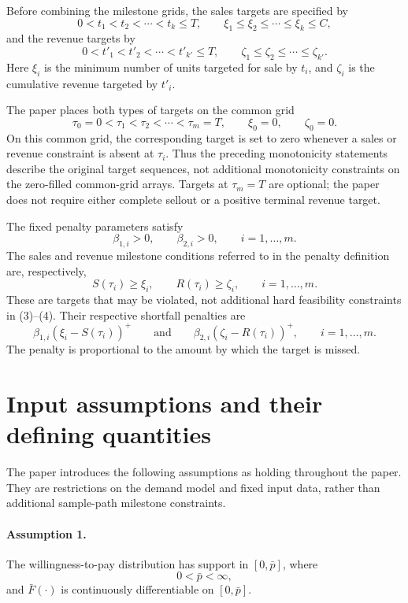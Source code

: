 \documentclass{article}
\begin{document}
Before combining the milestone grids, the sales targets are specified by
\[
0<t_1<t_2<\cdots<t_k\le T,
\qquad
\xi_1\le\xi_2\le\cdots\le\xi_k\le C,
\]
and the revenue targets by
\[
0<t'_1<t'_2<\cdots<t'_{k'}\le T,
\qquad
\zeta_1\le\zeta_2\le\cdots\le\zeta_{k'}.
\]
Here $\xi_i$ is the minimum number of units targeted for sale by $t_i$, and $\zeta_i$ is the cumulative revenue targeted by $t'_i$.

The paper places both types of targets on the common grid
\[
\tau_0=0<\tau_1<\tau_2<\cdots<\tau_m=T,
\qquad \xi_0=0,\qquad\zeta_0=0.
\]
On this common grid, the corresponding target is set to zero whenever a sales or revenue constraint is absent at $\tau_i$. Thus the preceding monotonicity statements describe the original target sequences, not additional monotonicity constraints on the zero-filled common-grid arrays. Targets at $\tau_m=T$ are optional; the paper does not require either complete sellout or a positive terminal revenue target.

The fixed penalty parameters satisfy
\[
\beta_{1,i}>0,\qquad\beta_{2,i}>0,
\qquad i=1,\ldots,m.
\]
The sales and revenue milestone conditions referred to in the penalty definition are, respectively,
\[
S(\tau_i)\ge\xi_i,
\qquad R(\tau_i)\ge\zeta_i,
\qquad i=1,\ldots,m.
\]
These are targets that may be violated, not additional hard feasibility constraints in (3)--(4). Their respective shortfall penalties are
\begin{equation}
\beta_{1,i}(\xi_i-S(\tau_i))^+
\qquad\text{and}\qquad
\beta_{2,i}(\zeta_i-R(\tau_i))^+,
\qquad i=1,\ldots,m.
\tag{2}
\end{equation}
The penalty is proportional to the amount by which the target is missed.

\section*{Input assumptions and their defining quantities}

The paper introduces the following assumptions as holding throughout the paper. They are restrictions on the demand model and fixed input data, rather than additional sample-path milestone constraints.

\paragraph{Assumption 1.}
The willingness-to-pay distribution has support in $[0,\bar p]$, where
\[
0<\bar p<\infty,
\]
and $\bar F(\cdot)$ is continuously differentiable on $[0,\bar p]$.
\end{document}
